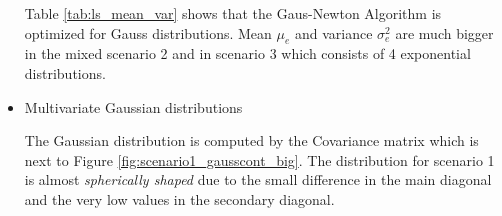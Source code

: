 \documentclass{article}
\begin{document}
\begin{itemize}
    Table \ref{tab:ls_mean_var} shows that the Gaus-Newton Algorithm is optimized for Gauss distributions. Mean $\mu_{e}$ and variance $\sigma^2_{e}$ are much bigger in the mixed scenario 2 and in scenario 3 which consists of 4 exponential distributions.
        
    \newpage
    
    \item Multivariate Gaussian distributions\\        
  
        \begin{figure}[hbt!]
        \begin{floatrow}
		\label{tab:scenario1_covariance}
		\end{floatrow}
		\end{figure}
		
		The Gaussian distribution is computed by the Covariance matrix which is next to Figure \ref{fig:scenario1_gausscont_big}. The distribution for scenario 1 is almost \textit{spherically shaped} due to the small difference in the main diagonal and the very low values in the secondary diagonal. 
		

\end{itemize}
\end{document}
